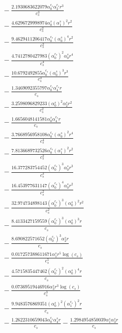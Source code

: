 \documentclass[10pt]{article}
\begin{document}
\begin{align*}
&{}  - \frac{2.1930683622079 \alpha_{0}^{c_s} \alpha_{2}^{c_s} r^{3}}{c_{s}^{3}} \\
&{}  - \frac{4.6296729998974 \alpha_{0}^s \left(\alpha_{1}^s\right)^{2} r^{2}}{c_{s}^{2}} \\
&{}  - \frac{9.4629411206417 \alpha_{0}^{c_s} \left(\alpha_{0}^s\right)^{4} r^{2}}{c_{s}^{2}} \\
&{}  - \frac{4.7412780427983 \left(\alpha_{0}^{c_s}\right)^{2} \alpha_{0}^s r^{4}}{c_{s}^{4}} \\
&{}  - \frac{10.6792492855 \alpha_{0}^{c_s} \left(\alpha_{0}^s\right)^{3} r^{3}}{c_{s}^{3}} \\
&{}  - \frac{1.3469092355797 \alpha_{0}^{c_s} \alpha_{4}^{c_s} r}{c_{s}} \\
&{}  - \frac{3.2598096829233 \left(\alpha_{0}^s\right)^{2} \alpha_{2}^s r^{2}}{c_{s}^{2}} \\
&{}  - \frac{1.6656048141581 \alpha_{0}^s \alpha_{4}^{c_s} r}{c_{s}} \\
&{}  - \frac{3.7668956958108 \alpha_{0}^{c_s} \left(\alpha_{0}^s\right)^{2} r^{4}}{c_{s}^{4}} \\
&{}  - \frac{7.8136689732526 \alpha_{0}^{c_s} \left(\alpha_{1}^s\right)^{2} r^{2}}{c_{s}^{2}} \\
&{}  - \frac{16.377283754452 \left(\alpha_{0}^{c_s}\right)^{3} \alpha_{0}^s r^{3}}{c_{s}^{3}} \\
&{}  - \frac{16.453977631147 \left(\alpha_{0}^{c_s}\right)^{4} \alpha_{0}^s r^{2}}{c_{s}^{2}} \\
&{}  - \frac{32.974734898143 \left(\alpha_{0}^{c_s}\right)^{3} \left(\alpha_{0}^s\right)^{2} r^{2}}{c_{s}^{2}} \\
&{}  - \frac{8.4133427159559 \left(\alpha_{0}^{c_s}\right)^{3} \left(\alpha_{0}^s\right)^{3} r}{c_{s}} \\
&{}  - \frac{8.690822571652 \left(\alpha_{0}^{c_s}\right)^{3} \alpha_{2}^s r}{c_{s}} \\
&{}  - \frac{0.017257388611671 \alpha_{1}^s r^{5} \log{\left(c_{s} \right)}}{c_{s}^{5}} \\
&{}  - \frac{4.5715835447462 \left(\alpha_{0}^{c_s}\right)^{2} \left(\alpha_{0}^s\right)^{4} r}{c_{s}} \\
&{}  - \frac{0.07369519446916 \alpha_{3}^s r^{3} \log{\left(c_{s} \right)}}{c_{s}^{3}} \\
&{}  - \frac{9.9483576869351 \left(\alpha_{0}^s\right)^{2} \left(\alpha_{1}^{c_s}\right)^{2} r}{c_{s}} \\
&{}  - \frac{1.2622310659043 \alpha_{0}^{c_s} \alpha_{4}^s r}{c_{s}} - \frac{1.2984954850039 \alpha_{1}^s \alpha_{3}^s r}{c_{s}} \\

\end{align*}
\end{document}
